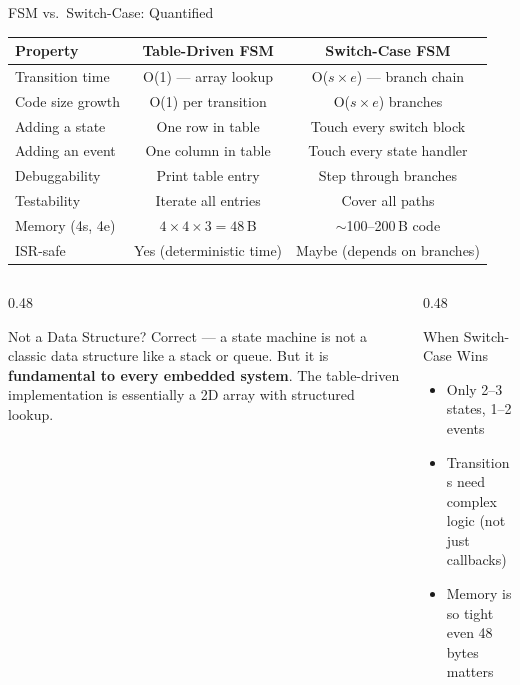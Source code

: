 \documentclass[aspectratio=169, 10pt]{beamer}
\begin{document}
\begin{frame}{FSM vs.\ Switch-Case: Quantified}
\begin{table}
\centering
\small
\begin{tabular}{@{}lcc@{}}
\toprule
\textbf{Property} & \textbf{Table-Driven FSM} & \textbf{Switch-Case FSM} \\
\midrule
Transition time       & O(1) --- array lookup     & O($s \times e$) --- branch chain \\
Code size growth      & O(1) per transition        & O($s \times e$) branches \\
Adding a state        & One row in table           & Touch every switch block \\
Adding an event       & One column in table        & Touch every state handler \\
Debuggability         & Print table entry           & Step through branches \\
Testability           & Iterate all entries         & Cover all paths \\
Memory (4s, 4e)       & $4\times4\times3 = 48$\,B  & $\sim$100--200\,B code \\
ISR-safe              & Yes (deterministic time)    & Maybe (depends on branches) \\
\bottomrule
\end{tabular}
\end{table}

\vspace{0.5em}
\begin{columns}[T]
\begin{column}{0.48\textwidth}
\begin{block}{Not a Data Structure?}
Correct --- a state machine is not a classic data structure
like a stack or queue. But it is \textbf{fundamental to every
embedded system}. The table-driven implementation is essentially
a 2D array with structured lookup.
\end{block}
\end{column}

\begin{column}{0.48\textwidth}
\begin{block}{When Switch-Case Wins}
\begin{itemize}
  \item Only 2--3 states, 1--2 events
  \item Transitions need complex logic (not just callbacks)
  \item Memory is so tight even 48 bytes matters
\end{itemize}
\end{block}
\end{column}
\end{columns}
\end{frame}
\end{document}

